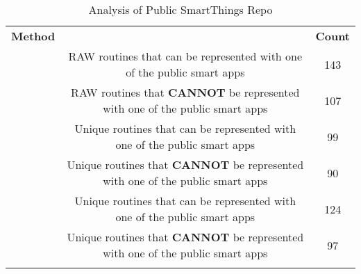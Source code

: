 \begin{table*}[t]
\centering
\scriptsize
\caption{{\small Analysis of Public SmartThings Repo}}
\label{tbl:public-analysis}
\begin{tabular*}{\textwidth}{c|c|c}
\Xhline{2\arrayrulewidth}
{\bf Method}&{\bf }& {\bf Count}\\
\Xhline{2\arrayrulewidth}
\rule{0pt}{3ex} \multirow{2}{*}{Manual}  & RAW routines that can be represented with one of the public smart apps & 143 \\
& RAW routines that \textbf{CANNOT} be represented with one of the public smart apps & 107 \\
\Xhline{2\arrayrulewidth}
\Xhline{2\arrayrulewidth}
\rule{0pt}{3ex} \multirow{2}{*}{Device Name + Device Capability} & Unique routines that can be represented with one of the public smart apps & 99 \\
& Unique routines that \textbf{CANNOT} be represented with one of the public smart apps & 90 \\
\Xhline{2\arrayrulewidth}
\Xhline{2\arrayrulewidth}
\rule{0pt}{3ex} \multirow{2}{*}{Device Name + Device Capability + Device Variable} & Unique routines that can be represented with one of the public smart apps & 124 \\
& Unique routines that \textbf{CANNOT} be represented with one of the public smart apps & 97 \\
\Xhline{2\arrayrulewidth}

\end{tabular*}
\end{table*}


